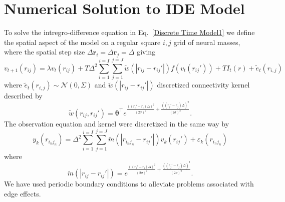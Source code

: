 \documentclass[onecolumn,draftcls]{IEEEtran}
\begin{document}
\section{Numerical Solution to IDE Model}\label{Space Discretization}
To solve the intregro-difference equation in Eq.~\ref{Discrete Time Model1} we define the spatial aspect of the model on a regular square $i,j$ grid of neural masses, where the spatial step size $\Delta \mathbf{r}_i = \Delta \mathbf{r}_j = \Delta $ giving
\begin{equation}\label{discrete space}
	v_{t+1}\left(r_{ij}\right) =  \lambda v_t(r_{ij}) + T \Delta^2 \sum_{i=1}^{i=I}{\sum_{j=1}^{j=J}{\tilde{w}\left( |r_{ij}-r_{ij}'| \right)f\left( v_t\left( r_{ij}'\right) \right)} } + T I_t\left(r\right) + \tilde{e}_t(r_{i,j})
\end{equation}
where $\tilde{e}_t(r_{i,j}) \sim \mathcal{N}\left(0,\Sigma\right)$ and $\tilde{w}(|r_{ij}-r_{ij}'|)$ discretized connectivity kernel described by
\begin{equation}\label{Discrete Connectivity Kernel}
	\tilde{w}(r_{ij},r_{ij}') = \mathbf{\theta}^{\top} e^{\frac{\left(\left(r_i'-r_i\right)\Delta\right)^2}{(2\sigma)^2} + \frac{\left(\left(r_j'-r_j\right)\Delta\right)^2}{(2\sigma)^2}}.
\end{equation}
The observation equation and kernel were discretized in the same way by
\begin{equation}\label{Discrete Observation Equation}
    y_k\left(r_{i_n j_n}\right) = \Delta^2\sum_{i=1}^{i=I}\sum_{j=1}^{j=J} \tilde{m}( |r_{i_n j_n}-r_{ij}'| ) v_k\left(r_{ij}'\right)  + \varepsilon_k( r_{i_n j_n})
\end{equation}
where
\begin{equation}\label{Discrete Observation Kernel}
	\tilde{m}(|r_{ij}-r_{ij}'|) = e^{\frac{\left(\left(r_i'-r_i\right)\Delta\right)^2}{(2\sigma)^2} + \frac{\left(\left(r_j'-r_j\right)\Delta\right)^2}{(2\sigma)^2}}.
\end{equation}
We have used periodic boundary conditions to alleviate problems associated with edge effects.
\end{document}
